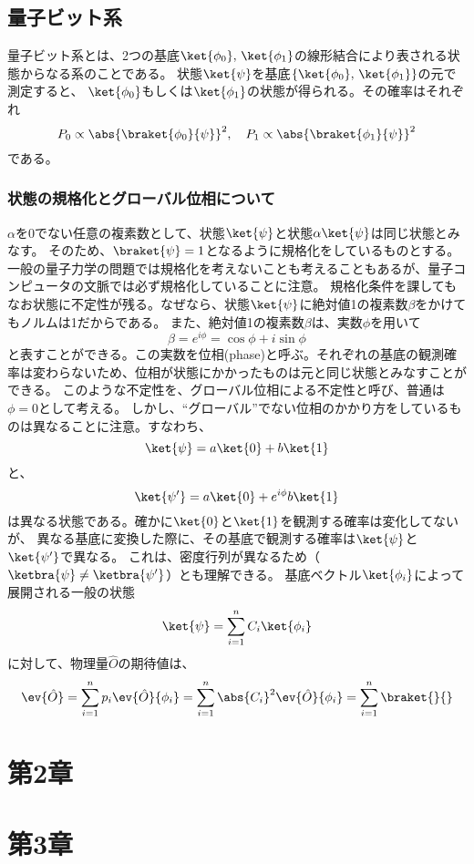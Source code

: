 \documentclass[a4paper,11pt,uplatex]{jsarticle}%
\begin{document}
\subsection{量子ビット系}
量子ビット系とは、2つの基底$\ket{\phi_0},\,\ket{\phi_1}$の線形結合により表される状態からなる系のことである。
状態$\ket{\psi}$を基底$\{\ket{\phi_0},\,\ket{\phi_1}\}$の元で測定すると、
$\ket{\phi_0}$もしくは$\ket{\phi_1}$の状態が得られる。その確率はそれぞれ
\begin{equation}
  P_0 \propto \abs{\braket{\phi_0}{\psi}}^2,\quad P_1 \propto \abs{\braket{\phi_1}{\psi}}^2
\end{equation}
である。
\subsubsection{状態の規格化とグローバル位相について}
$\alpha$を$0$でない任意の複素数として、状態$\ket{\psi}$と状態$\alpha\ket{\psi}$は同じ状態とみなす。
そのため、$\braket{\psi}=1$となるように規格化をしているものとする。
一般の量子力学の問題では規格化を考えないことも考えることもあるが、量子コンピュータの文脈では必ず規格化していることに注意。
規格化条件を課してもなお状態に不定性が残る。なぜなら、状態$\ket{\psi}$に絶対値1の複素数$\beta$をかけてもノルムは1だからである。
また、絶対値1の複素数$\beta$は、実数$\phi$を用いて
\begin{equation}
  \beta=e^{i\phi} = \cos\phi+i\sin\phi
\end{equation}
と表すことができる。この実数を位相(phase)と呼ぶ。それぞれの基底の観測確率は変わらないため、位相が状態にかかったものは元と同じ状態とみなすことができる。
このような不定性を、グローバル位相による不定性と呼び、普通は$\phi=0$として考える。
しかし、``グローバル''でない位相のかかり方をしているものは異なることに注意。すなわち、
\begin{equation}
  \ket{\psi}=a\ket{0}+b\ket{1}
\end{equation}
と、
\begin{equation}
  \ket{\psi'}=a\ket{0}+e^{i\phi}b\ket{1}
\end{equation}
は異なる状態である。確かに$\ket{0}$と$\ket{1}$を観測する確率は変化してないが、
異なる基底に変換した際に、その基底で観測する確率は$\ket{\psi}$と$\ket{\psi'}$で異なる。
これは、密度行列が異なるため（$\ketbra{\psi}\neq\ketbra{\psi'}$）とも理解できる。
基底ベクトル$\ket{\phi_i}$によって展開される一般の状態
\begin{equation}
  \ket{\psi}=\sum_{i=1}^{n}C_i\ket{\phi_i}
\end{equation}
に対して、物理量$\hat{O}$の期待値は、
\begin{equation}
  \ev{\hat{O}} = \sum_{i=1}^{n}p_i\ev{\hat{O}}{\phi_i} 
  = \sum_{i=1}^{n} \abs{C_i}^2\ev{\hat{O}}{\phi_i} 
  = \sum_{i=1}^{n}\braket{}{}
\end{equation}

\section{第2章}

\section{第3章}
\end{document}
